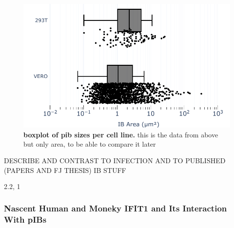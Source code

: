 \begin{figure}
    \centering
    \includegraphics[width=0.75\linewidth]{09. Chapter 4/Figs/01. pIB/01. pIB characterisation/03. box-pib.pdf}
    \caption[boxplot of pib sizes per cell line.]{\textbf{boxplot of pib sizes per cell line.} this is the data from above but only area, to be able to compare it later}
    \label{fig:boxplot of pib sizes per cell line}
\end{figure}

DESCRIBE AND CONTRAST TO INFECTION AND TO PUBLISHED (PAPERS AND FJ THESIS) IB STUFF

2.2, 1 


\subsubsection{Nascent Human and Moneky IFIT1 and Its Interaction With pIBs}

